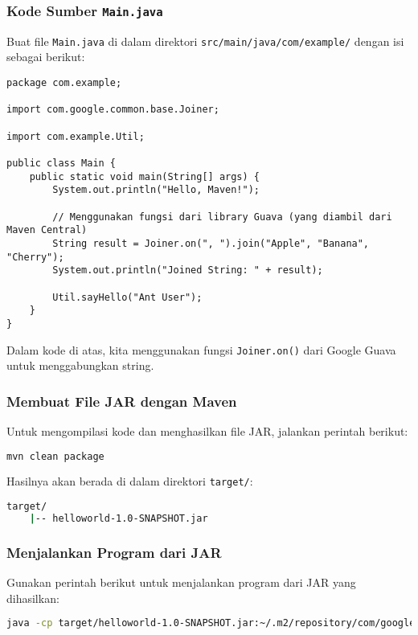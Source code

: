 \subsubsection{Kode Sumber \texttt{Main.java}}
Buat file \texttt{Main.java} di dalam direktori \texttt{src/main/java/com/example/} dengan isi sebagai berikut:

\begin{lstlisting}[style=JavaStyle]
package com.example;

import com.google.common.base.Joiner;

import com.example.Util;

public class Main {
	public static void main(String[] args) {
		System.out.println("Hello, Maven!");
		
		// Menggunakan fungsi dari library Guava (yang diambil dari Maven Central)
		String result = Joiner.on(", ").join("Apple", "Banana", "Cherry");
		System.out.println("Joined String: " + result);
		
		Util.sayHello("Ant User");
	}
}
\end{lstlisting}

Dalam kode di atas, kita menggunakan fungsi \texttt{Joiner.on()} dari Google Guava untuk menggabungkan string.

\subsubsection{Membuat File JAR dengan Maven}
Untuk mengompilasi kode dan menghasilkan file JAR, jalankan perintah berikut:

\begin{lstlisting}[language=bash]
	mvn clean package
\end{lstlisting}

Hasilnya akan berada di dalam direktori \texttt{target/}:

\begin{lstlisting}[language=bash]
	target/
	|-- helloworld-1.0-SNAPSHOT.jar
\end{lstlisting}

\subsubsection{Menjalankan Program dari JAR}
Gunakan perintah berikut untuk menjalankan program dari JAR yang dihasilkan:

\begin{lstlisting}[language=bash]
	java -cp target/helloworld-1.0-SNAPSHOT.jar:~/.m2/repository/com/google/guava/guava/33.4.0-jre/33.4.0-jre.jar com.example.Main
\end{lstlisting}

